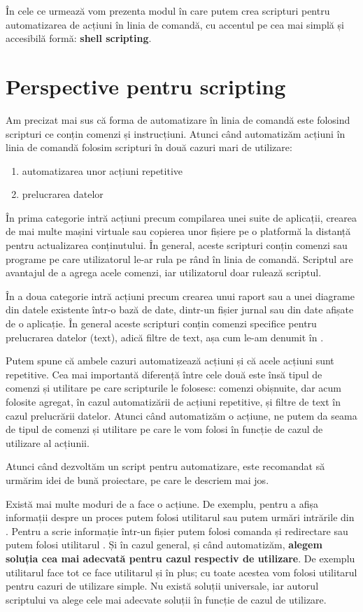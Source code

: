 În cele ce urmează vom prezenta modul în care putem crea scripturi pentru automatizarea de acțiuni în linia de comandă, cu accentul pe cea mai simplă și accesibilă formă: \textbf{shell scripting}.

\section{Perspective pentru scripting}
\label{sec:auto:how}

Am precizat mai sus că forma de automatizare în linia de comandă este folosind scripturi ce conțin comenzi și instrucțiuni.
Atunci când automatizăm acțiuni în linia de comandă folosim scripturi în două cazuri mari de utilizare:
\begin{enumerate}
  \item automatizarea unor acțiuni repetitive
  \item prelucrarea datelor
\end{enumerate}

În prima categorie intră acțiuni precum compilarea unei suite de aplicații, crearea de mai multe mașini virtuale sau copierea unor fișiere pe o platformă la distanță pentru actualizarea conținutului.
În general, aceste scripturi conțin comenzi sau programe pe care utilizatorul le-ar rula pe rând în linia de comandă.
Scriptul are avantajul de a agrega acele comenzi, iar utilizatorul doar rulează scriptul.

În a doua categorie intră acțiuni precum crearea unui raport sau a unei diagrame din datele existente într-o bază de date, dintr-un fișier jurnal sau din date afișate de o aplicație.
În general aceste scripturi conțin comenzi specifice pentru prelucrarea datelor (text), adică filtre de text, așa cum le-am denumit în .

Putem spune că ambele cazuri automatizează acțiuni și că acele acțiuni sunt repetitive.
Cea mai importantă diferență între cele două este însă tipul de comenzi și utilitare pe care scripturile le folosesc: comenzi obișnuite, dar acum folosite agregat, în cazul automatizării de acțiuni repetitive, și filtre de text în cazul prelucrării datelor.
Atunci când automatizăm o acțiune, ne putem da seama de tipul de comenzi și utilitare pe care le vom folosi în funcție de cazul de utilizare al acțiunii.

Atunci când dezvoltăm un script pentru automatizare, este recomandat să urmărim idei de bună proiectare, pe care le descriem mai jos.

Există mai multe moduri de a face o acțiune.
De exemplu, pentru a afișa informații despre un proces putem folosi utilitarul  sau putem urmări intrările din .
Pentru a scrie informație într-un fișier putem folosi comanda  și redirectare sau putem folosi utilitarul .
Și în cazul general, și când automatizăm, \textbf{alegem soluția cea mai adecvată pentru cazul respectiv de utilizare}.
De exemplu utilitarul  face tot ce face utilitarul  și în plus; cu toate acestea vom folosi utilitarul  pentru cazuri de utilizare simple.
Nu există soluții universale, iar autorul scriptului va alege cele mai adecvate soluții în funcție de cazul de utilizare.

